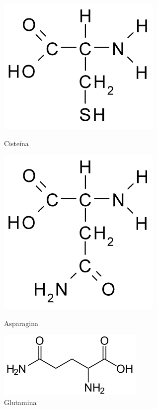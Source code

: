 \begin{figure}[H]
	\begin{center}
		\begin{minipage}{0.3\linewidth}
			\centering   
			\includegraphics[width=0.8\linewidth]{secProteins/figures/cysteine.png}	
			\caption{Cisteína}
			\label{fig:cysteine}
		\end{minipage}
		\begin{minipage}{0.3\linewidth}
			\centering   
			\includegraphics[width=0.65\linewidth]{secProteins/figures/asparagine.png}
			\caption{Asparagina}
			\label{fig:asparagine}
		\end{minipage}
		\begin{minipage}{0.3\linewidth}
			\centering   
			\includegraphics[width=1\linewidth]{secProteins/figures/glutamine.png}
			\caption{Glutamina}
			\label{fig:glutamine}
		\end{minipage}
	\end{center}
\end{figure}
